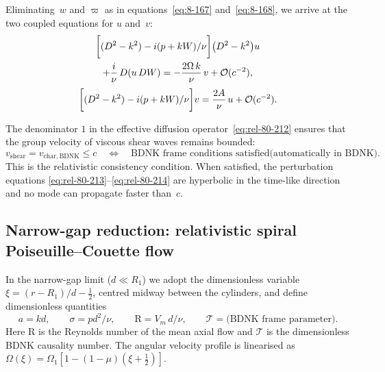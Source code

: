 Eliminating~$w$ and $\varpi$ as in equations~\eqref{eq:8-167}
and~\eqref{eq:8-168}, we arrive at the two coupled equations for $u$
and~$v$:
\begin{multline}
\label{eq:rel-80-213}
\biggl[(D^{2}-k^{2})
  - i(p+kW)/\nu\biggr]
  \bigl(D^{2}-k^{2}\bigr)u \\
  + \frac{i}{\nu}\,D\!\left(u\,DW\right)
  = -\frac{2\Omega\,k}{\nu}\,v
  + \mathcal{O}(c^{-2}),
\end{multline}
\begin{equation}
\label{eq:rel-80-214}
\biggl[(D^{2}-k^{2})
  - i(p+kW)/\nu\biggr]v
= \frac{2A}{\nu}\,u
+ \mathcal{O}(c^{-2}).
\end{equation}

\begin{causalitycheck}
The denominator $1$ in the effective diffusion
operator~\eqref{eq:rel-80-212} ensures that the group velocity of
viscous shear waves remains bounded:
\begin{equation}
\label{eq:rel-80-215}
v_{\mathrm{shear}}
  = v_{\mathrm{char,BDNK}}
  \le c
  \quad\Longleftrightarrow\quad
  \text{BDNK frame conditions satisfied}
  \text{(automatically in BDNK)}.
\end{equation}
This is the relativistic
consistency condition.  When satisfied, the perturbation equations
\eqref{eq:rel-80-213}--\eqref{eq:rel-80-214} are hyperbolic in the
time-like direction and no mode can propagate faster than~$c$.
\end{causalitycheck}

\subsection{Narrow-gap reduction: relativistic spiral
Poiseuille--Couette flow}\label{sec:rel-80-narrow}

In the narrow-gap limit ($d\ll R_{1}$) we adopt the
dimensionless variable $\xi=(r-R_{1})/d-\tfrac{1}{2}$, centred
midway between the cylinders, and define dimensionless quantities
\begin{equation}
\label{eq:rel-80-216}
a = kd,\qquad
\sigma = pd^{2}/\nu,\qquad
\mathrm{R} = V_{m}\,d/\nu,\qquad
\mathcal{T} = \text{(BDNK frame parameter)}.
\end{equation}
Here $\mathrm{R}$ is the Reynolds number of the mean axial flow and
$\mathcal{T}$ is the dimensionless BDNK causality number.
The angular velocity profile is linearised as
$\Omega(\xi)=\Omega_{1}[1-(1-\mu)(\xi+\tfrac{1}{2})]$.

